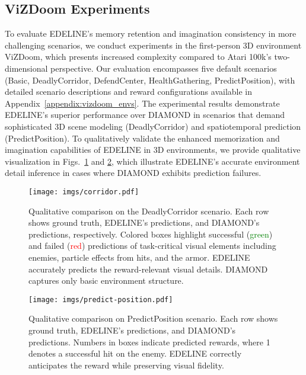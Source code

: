 \subsection{ViZDoom Experiments}
\label{subsec:vizdoom_experiments}

To evaluate EDELINE's memory retention and imagination consistency in more challenging scenarios, we conduct experiments in the first-person 3D environment ViZDoom, which presents increased complexity compared to Atari 100k's two-dimensional perspective. Our evaluation encompasses five default scenarios (Basic, DeadlyCorridor, DefendCenter, HealthGathering, PredictPosition), with detailed scenario descriptions and reward configurations available in Appendix~\ref{appendix:vizdoom_envs}. The experimental results demonstrate EDELINE's superior performance over DIAMOND in scenarios that demand sophisticated 3D scene modeling (DeadlyCorridor) and spatiotemporal prediction (PredictPosition). To qualitatively validate the enhanced memorization and imagination capabilities of EDELINE in 3D environments, we provide qualitative visualization in Figs.~\ref{fig:deadlyCorridor_qualitative} and \ref{fig:predictPosition_qualitative}, which illustrate EDELINE's accurate environment detail inference in cases where DIAMOND exhibits prediction failures.

\begin{figure}[ht]
    \centering
    \texttt{[image: imgs/corridor.pdf]}

    \caption{Qualitative comparison on the DeadlyCorridor scenario. Each row shows ground truth, EDELINE's predictions, and DIAMOND's predictions, respectively. Colored boxes highlight successful (\textcolor{green}{green}) and failed (\textcolor{red}{red}) predictions of task-critical visual elements including enemies, particle effects from hits, and the armor. EDELINE accurately predicts the reward-relevant visual details. DIAMOND captures only basic environment structure.}
    \label{fig:deadlyCorridor_qualitative}
\end{figure}

\begin{figure}[ht]
    \centering
    \texttt{[image: imgs/predict-position.pdf]}

    \caption{Qualitative comparison on PredictPosition scenario. Each row shows ground truth, EDELINE's predictions, and DIAMOND's predictions. Numbers in boxes indicate predicted rewards, where 1 denotes a successful hit on the enemy. EDELINE correctly anticipates the reward while preserving visual fidelity.
    }
    \label{fig:predictPosition_qualitative}
    \vspace{-1em}
\end{figure}

